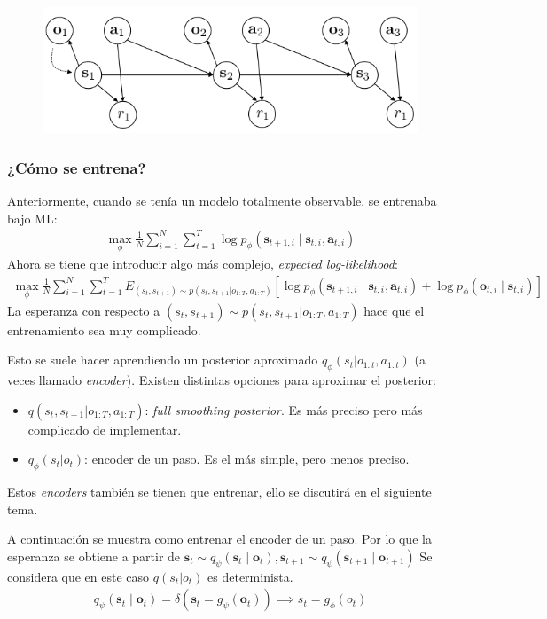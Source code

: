 \begin{figure}[H]
	\centering
	\includegraphics[width=0.5\linewidth]{figures/2020-06-27-194435_590x198_scrot.png}
\end{figure}

\subsubsection{¿Cómo se entrena?}%
\label{ssub:_cómo_se_entrena_}

Anteriormente, cuando se tenía un modelo totalmente observable, se entrenaba bajo ML:
\begin{align}
\max _{\phi} \frac{1}{N} \sum_{i=1}^{N} \sum_{t=1}^{T} \log p_{\phi}\left(\mathbf{s}_{t+1, i} \mid \mathbf{s}_{t, i}, \mathbf{a}_{t, i}\right)
\end{align}
Ahora se tiene que introducir algo más complejo, \textit{expected log-likelihood}:
\begin{align}
    \max _{\phi} \frac{1}{N} \sum_{i=1}^{N} \sum_{t=1}^{T} E_{(s_t,s_{t+1})\sim
    p(s_t,s_{t+1}|o_{1:T},a_{1:T})}\left[\log p_{\phi}\left(\mathbf{s}_{t+1, i} \mid \mathbf{s}_{t, i}, \mathbf{a}_{t, i}\right)+\log p_{\phi}\left(\mathbf{o}_{t, i} \mid \mathbf{s}_{t, i}\right)\right]
\end{align}
La esperanza con respecto a $(s_t,s_{t+1})\sim p(s_t,s_{t+1}|o_{1:T},a_{1:T})$ hace que el
entrenamiento sea muy complicado.

Esto se suele hacer aprendiendo un posterior aproximado $q_\phi(s_t|o_{1:t},a_{1:t})$ (a veces
llamado \textit{encoder}). Existen distintas opciones para aproximar el posterior:
\begin{itemize}
    \item $q(s_t,s_{t+1}|o_{1:T},a_{1:T})$:  \textit{full smoothing posterior}. Es más
        preciso pero más complicado de implementar.
    \item $q_\phi(s_t|o_t)$: encoder de un paso. Es el más simple, pero menos preciso.
\end{itemize}

Estos \textit{encoders} también se tienen que entrenar, ello se discutirá en el siguiente tema.

A continuación se muestra como entrenar el encoder de un paso. Por lo que la esperanza se obtiene
a partir de
$\mathbf{s}_{t} \sim q_{\psi}\left(\mathbf{s}_{t} \mid \mathbf{o}_{t}\right), \mathbf{s}_{t+1} \sim q_{\psi}\left(\mathbf{s}_{t+1} \mid \mathbf{o}_{t+1}\right)$
Se considera que en este caso $q(s_t|o_t)$ es determinista.
\begin{align}
q_{\psi}\left(\mathbf{s}_{t} \mid
\mathbf{o}_{t}\right)=\delta\left(\mathbf{s}_{t}=g_{\psi}\left(\mathbf{o}_{t}\right)\right)
\implies s_t = g_\phi(o_t)
\end{align}

